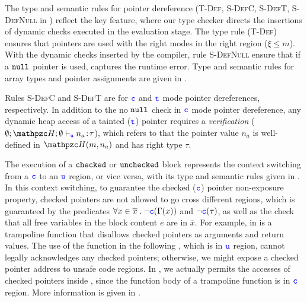 The type and semantic rules for pointer dereference (\textsc{T-Def}, \textsc{S-DefC},
\textsc{S-DefT}, \textsc{S-DefNull} in )
reflect the key \systemname feature, where our type checker directs the insertions of dynamic checks executed in the evaluation stage.
The type rule (\textsc{T-Def}) ensures that pointers are used with the right modes in the right region ($\xi \le m$).
With the dynamic checks inserted by the compiler, rule \textsc{S-DefNull} ensure that if a $\mathtt{null}$ pointer is used,
\systemname captures the runtime error.
Type and semantic rules for array types and pointer assignments are given in .

Rules \textsc{S-DefC} and \textsc{S-DefT} are for $\textcolor{blue}{\texttt{c}}$ and $\textcolor{blue}{\texttt{t}}$ mode pointer dereferences, respectively.
In addition to the no $\mathtt{null}$ check in $\textcolor{blue}{\texttt{c}}$ mode pointer dereference,
any dynamic heap access of a tainted ($\textcolor{blue}{\texttt{t}}$) pointer requires a \textit{verification} ($\emptyset;\heap ; \emptyset \vdash_{\umode}\evalue{n_a}{\tau}$), which refers to that the pointer value $n_a$ is well-defined in $\heap(m,n_a)$ and has right type $\tau$.

The execution of a $\mathtt{checked}$ or $\mathtt{unchecked}$ block represents 
the context switching from a $\textcolor{blue}{\texttt{c}}$ to an $\textcolor{blue}{\texttt{u}}$ region, or vice versa,
with its type and semantic rules given in .
In this context switching, to guarantee the checked ($\textcolor{blue}{\texttt{c}}$) pointer non-exposure property, 
checked pointers are not allowed to go cross different regions, which is guaranteed by the predicates 
$\forall x\in\overline{x}\;.\;\neg\textcolor{blue}{\texttt{c}}(\Gamma(x))$ and $\neg\textcolor{blue}{\texttt{c}}(\tau)$,
as well as the check that all free variables in the block content $e$ are in $\overline{x}$.
For example,  in  is a trampoline function that disallows
checked pointers as arguments and return values.
The use of the function in the following , which is in $\textcolor{blue}{\texttt{u}}$ region,
cannot legally acknowledges any checked pointers; otherwise, we might expose a checked pointer address to unsafe code regions.
In \systemname, we actually permits the accesses of checked pointers inside ,
since the function body of a trampoline function is in $\textcolor{blue}{\texttt{c}}$ region.
More information is given in .

